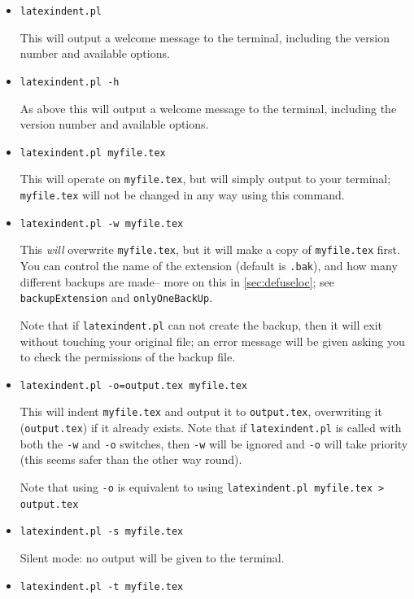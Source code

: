 \documentclass[11pt]{article}
\newcommand{\verbitem}[1]{\small\PVerb{#1}}
\begin{document}
\begin{itemize}[labelsep=.25cm]
	\item[] \lstinline!latexindent.pl!

	      This will output a welcome message to the terminal, including the version number
	      and available options.
	\item[\verbitem{-h, --help}] \lstinline!latexindent.pl -h!

	      As above this will output a welcome message to the terminal, including the version number
	      and available options.
	\item[] \lstinline!latexindent.pl myfile.tex!

	      This will operate on \lstinline!myfile.tex!, but will simply output to your terminal; \lstinline!myfile.tex! will	not be changed in any way using this command.
	\item[\verbitem{-w, --overwrite}] \lstinline!latexindent.pl -w myfile.tex!

	      This \emph{will} overwrite \lstinline!myfile.tex!, but it will
	      make a copy of \lstinline!myfile.tex! first. You can control the name of
	      the extension (default is \lstinline!.bak!), and how many different backups are made--
	      more on this in \cref{sec:defuseloc}; see \lstinline!backupExtension! and \lstinline!onlyOneBackUp!.

	      Note that if \lstinline!latexindent.pl! can not create the backup, then it
	      will exit without touching your original file; an error message will be given
	      asking you to check the permissions of the backup file.
	\item[\verbitem{-o=output.tex,--outputfile=output.tex}] \lstinline!latexindent.pl -o=output.tex myfile.tex!

	      This will indent \lstinline!myfile.tex! and output it to \lstinline!output.tex!,
	      overwriting it (\lstinline!output.tex!) if it already exists. Note that if \lstinline!latexindent.pl! is called with both
	      the \lstinline!-w! and \lstinline!-o! switches, then \lstinline!-w! will
	      be ignored and \lstinline!-o! will take priority (this seems safer than the
	      other way round).

	      Note that using \lstinline!-o! is equivalent to using \lstinline!latexindent.pl myfile.tex > output.tex!
	\item[\verbitem{-s, --silent}] \lstinline!latexindent.pl -s myfile.tex!

	      Silent mode: no output will be given to the terminal.
	\item[\verbitem{-t, --trace}] \lstinline!latexindent.pl -t myfile.tex!


\end{itemize}
\end{document}
